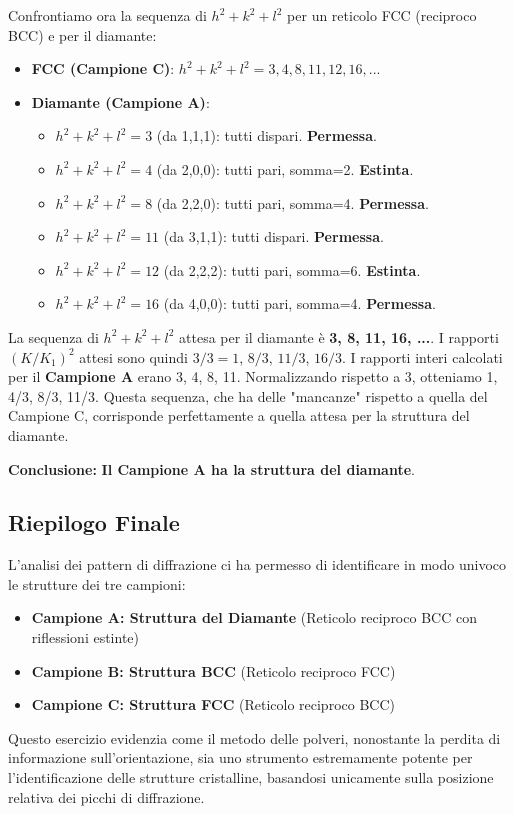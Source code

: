 Confrontiamo ora la sequenza di $h^2+k^2+l^2$ per un reticolo FCC (reciproco BCC) e per il diamante:
\begin{itemize}
    \item \textbf{FCC (Campione C)}: $h^2+k^2+l^2 = 3, 4, 8, 11, 12, 16, ...$
    \item \textbf{Diamante (Campione A)}:
        \begin{itemize}
            \item $h^2+k^2+l^2=3$ (da 1,1,1): tutti dispari. \textbf{Permessa}.
            \item $h^2+k^2+l^2=4$ (da 2,0,0): tutti pari, somma=2. \textbf{Estinta}.
            \item $h^2+k^2+l^2=8$ (da 2,2,0): tutti pari, somma=4. \textbf{Permessa}.
            \item $h^2+k^2+l^2=11$ (da 3,1,1): tutti dispari. \textbf{Permessa}.
            \item $h^2+k^2+l^2=12$ (da 2,2,2): tutti pari, somma=6. \textbf{Estinta}.
            \item $h^2+k^2+l^2=16$ (da 4,0,0): tutti pari, somma=4. \textbf{Permessa}.
        \end{itemize}
\end{itemize}
La sequenza di $h^2+k^2+l^2$ attesa per il diamante è \textbf{3, 8, 11, 16, ...}.
I rapporti $(K/K_1)^2$ attesi sono quindi $3/3=1$, $8/3$, $11/3$, $16/3$.
I rapporti interi calcolati per il \textbf{Campione A} erano 3, 4, 8, 11. Normalizzando rispetto a 3, otteniamo 1, 4/3, 8/3, 11/3. Questa sequenza, che ha delle "mancanze" rispetto a quella del Campione C, corrisponde perfettamente a quella attesa per la struttura del diamante.

\textbf{Conclusione:} \textbf{Il Campione A ha la struttura del diamante}.

\subsection{Riepilogo Finale}

L'analisi dei pattern di diffrazione ci ha permesso di identificare in modo univoco le strutture dei tre campioni:
\begin{itemize}
    \item \textbf{Campione A: Struttura del Diamante} (Reticolo reciproco BCC con riflessioni estinte)
    \item \textbf{Campione B: Struttura BCC} (Reticolo reciproco FCC)
    \item \textbf{Campione C: Struttura FCC} (Reticolo reciproco BCC)
\end{itemize}

Questo esercizio evidenzia come il metodo delle polveri, nonostante la perdita di informazione sull'orientazione, sia uno strumento estremamente potente per l'identificazione delle strutture cristalline, basandosi unicamente sulla posizione relativa dei picchi di diffrazione.